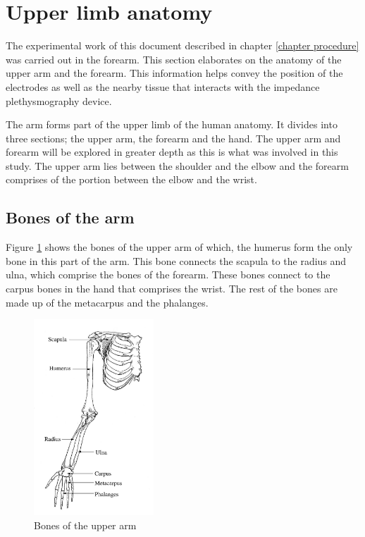 \section{Upper limb anatomy}
\label{section literature anatomy}
The experimental work of this document described in chapter \ref{chapter procedure} was carried out in the forearm. This section elaborates on the anatomy of the upper arm and the forearm. This information helps convey the position of the electrodes as well as the nearby tissue that interacts with the impedance plethysmography device. 

The arm forms part of the upper limb of the human anatomy. It divides into three sections; the upper arm, the forearm and the hand. The upper arm and forearm will be explored in greater depth as this is what was involved in this study. The upper arm lies between the shoulder and the elbow and the forearm comprises of the portion between the elbow and the wrist. 


\subsection{Bones of the arm}
Figure \ref{fig:upper limb bones} shows the bones of the upper arm of which, the humerus form the only bone in this part of the arm. This bone connects the scapula to the radius and ulna, which comprise the bones of the forearm. These bones connect to the carpus bones in the hand that comprises the wrist. The rest of the bones are made up of the metacarpus and the phalanges. 

\begin{figure}[!htpb]
	\centering
	\includegraphics[width=0.4\textwidth,keepaspectratio]{figure_20} 
	\caption{Bones of the upper arm}
	\label{fig:upper limb bones}
\end{figure}


